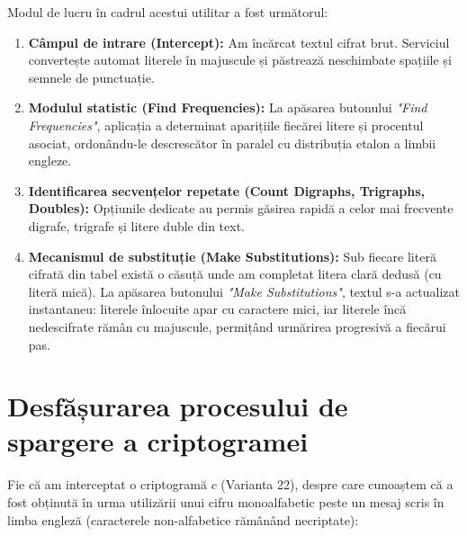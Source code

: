 \documentclass{labreport}
\begin{document}
Modul de lucru în cadrul acestui utilitar a fost următorul:
\begin{enumerate}[leftmargin=*]
    \item \textbf{Câmpul de intrare (Intercept):} Am încărcat textul cifrat brut. Serviciul convertește automat literele în majuscule și păstrează neschimbate spațiile și semnele de punctuație.
    \item \textbf{Modulul statistic (Find Frequencies):} La apăsarea butonului \textit{"Find Frequencies"}, aplicația a determinat aparițiile fiecărei litere și procentul asociat, ordonându-le descrescător în paralel cu distribuția etalon a limbii engleze.
    \item \textbf{Identificarea secvențelor repetate (Count Digraphs, Trigraphs, Doubles):} Opțiunile dedicate au permis găsirea rapidă a celor mai frecvente digrafe, trigrafe și litere duble din text.
    \item \textbf{Mecanismul de substituție (Make Substitutions):} Sub fiecare literă cifrată din tabel există o căsuță unde am completat litera clară dedusă (cu literă mică). La apăsarea butonului \textit{"Make Substitutions"}, textul s-a actualizat instantaneu: literele înlocuite apar cu caractere mici, iar literele încă nedescifrate rămân cu majuscule, permițând urmărirea progresivă a fiecărui pas.
\end{enumerate}

\section{Desfășurarea procesului de spargere a criptogramei}

Fie că am interceptat o criptogramă $c$ (Varianta 22), despre care cunoaștem că a fost obținută în urma utilizării unui cifru monoalfabetic peste un mesaj scris în limba engleză (caracterele non-alfabetice rămânând necriptate):
\end{document}

